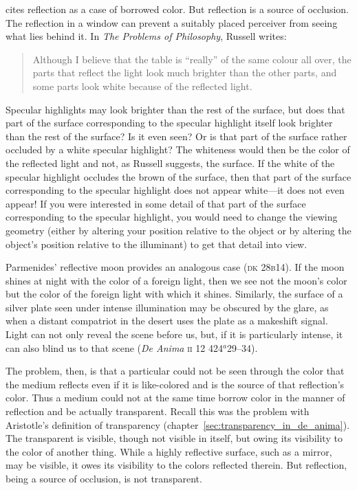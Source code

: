 \citet{Sorabji:2004fk} cites reflection as a case of borrowed color. But reflection is a source of occlusion. The reflection in a window can prevent a suitably placed perceiver from seeing what lies behind it. In \emph{The Problems of Philosophy}, Russell writes:
	\begin{quote}
		Although I believe that the table is ``really'' of the same colour all over, the parts that reflect the light look much brighter than the other parts, and some parts look white because of the reflected light. \citep[2]{Russell:1912uq}
	\end{quote}
Specular highlights may look brighter than the rest of the surface, but does that part of the surface corresponding to the specular highlight itself look brighter than the rest of the surface? Is it even seen? Or is that part of the surface rather occluded by a white specular highlight? The whiteness would then be the color of the reflected light and not, as Russell suggests, the surface. If the white of the specular highlight occludes the brown of the surface, then that part of the surface corresponding to the specular highlight does not appear white---it does not even appear! If you were interested in some detail of that part of the surface corresponding to the specular highlight, you would need to change the viewing geometry (either by altering your position relative to the object or by altering the object's position relative to the illuminant) to get that detail into view. 

Parmenides' reflective moon provides an analogous case (\textsc{dk} 28\textsc{b}14). If the moon shines at night with the color of a foreign light, then we see not the moon's color but the color of the foreign light with which it shines. Similarly, the surface of a silver plate seen under intense illumination may be obscured by the glare, as when a distant compatriot in the desert uses the plate as a makeshift signal. Light can not only reveal the scene before us, but, if it is particularly intense, it can also blind us to that scene (\emph{De Anima} \textsc{ii} 12 424\( ^{a} \)29--34). 

The problem, then, is that a particular could not be seen through the color that the medium reflects even if it is like-colored and is the source of that reflection's color. Thus a medium could not at the same time borrow color in the manner of reflection and be actually transparent. Recall this was the problem with Aristotle's definition of transparency (chapter~\ref{sec:transparency_in_de_anima}). The transparent is visible, though not visible in itself, but owing its visibility to the color of another thing. While a highly reflective surface, such as a mirror, may be visible, it owes its visibility to the colors reflected therein. But reflection, being a source of occlusion, is not transparent.

